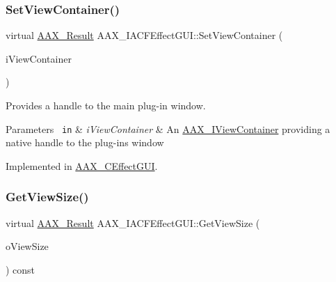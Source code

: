 \mbox{\label{a01665_a50830385c58f104c87b6ef25144b30dd}} 
\subsubsection{\texorpdfstring{SetViewContainer()}{SetViewContainer()}}
{\footnotesize\ttfamily virtual \mbox{\hyperlink{a00392_a4d8f69a697df7f70c3a8e9b8ee130d2f}{A\+A\+X\+\_\+\+Result}} A\+A\+X\+\_\+\+I\+A\+C\+F\+Effect\+G\+U\+I\+::\+Set\+View\+Container (\begin{DoxyParamCaption}\item[{\mbox{\hyperlink{a01409}{I\+A\+C\+F\+Unknown}} $\ast$}]{i\+View\+Container }\end{DoxyParamCaption})\hspace{0.3cm}{\ttfamily [pure virtual]}}



Provides a handle to the main plug-\/in window. 


\begin{DoxyParams}[1]{Parameters}
\mbox{\texttt{ in}}  & {\em i\+View\+Container} & An \mbox{\hyperlink{a01889}{A\+A\+X\+\_\+\+I\+View\+Container}} providing a native handle to the plug-\/in\textquotesingle{}s window \\
\hline
\end{DoxyParams}


Implemented in \mbox{\hyperlink{a01477_a5ba8d0cf5326583ed9e2a4b9752e4287}{A\+A\+X\+\_\+\+C\+Effect\+G\+UI}}.

\mbox{\label{a01665_ae67c876225e9b5c538560d19a842a34c}} 
\subsubsection{\texorpdfstring{GetViewSize()}{GetViewSize()}}
{\footnotesize\ttfamily virtual \mbox{\hyperlink{a00392_a4d8f69a697df7f70c3a8e9b8ee130d2f}{A\+A\+X\+\_\+\+Result}} A\+A\+X\+\_\+\+I\+A\+C\+F\+Effect\+G\+U\+I\+::\+Get\+View\+Size (\begin{DoxyParamCaption}\item[{\mbox{\hyperlink{a01609}{A\+A\+X\+\_\+\+Point}} $\ast$}]{o\+View\+Size }\end{DoxyParamCaption}) const\hspace{0.3cm}{\ttfamily [pure virtual]}}



